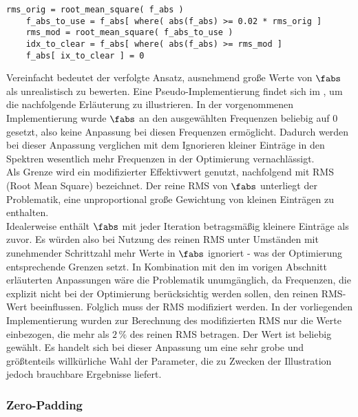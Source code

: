\documentclass[../Report.tex]{subfiles}
\begin{document}
\lstset{language=Python}
\begin{lstlisting}[caption={Pseudocode zur Veranschaulichung der Anpassung des Korrekturterms}, label=code:opt.H.pseudoRMS, numbers=none]
	rms_orig = root_mean_square( f_abs )
	f_abs_to_use = f_abs[ where( abs(f_abs) >= 0.02 * rms_orig ] 
	rms_mod = root_mean_square( f_abs_to_use )
	idx_to_clear = f_abs[ where( abs(f_abs) >= rms_mod ] 
	f_abs[ ix_to_clear ] = 0
\end{lstlisting}
Vereinfacht bedeutet der verfolgte Ansatz, ausnehmend große Werte von $\fabs$ als unrealistisch zu bewerten. Eine Pseudo-Implementierung findet sich im , um die nachfolgende Erläuterung zu illustrieren. In der vorgenommenen Implementierung wurde $\fabs$ an den ausgewählten Frequenzen beliebig auf $0$ gesetzt, also keine Anpassung bei diesen Frequenzen ermöglicht.
Dadurch werden bei dieser Anpassung verglichen mit dem Ignorieren kleiner Einträge in den Spektren wesentlich mehr Frequenzen in der Optimierung vernachlässigt.
\\
Als Grenze wird ein modifizierter Effektivwert genutzt, nachfolgend mit RMS (Root Mean Square) bezeichnet. 
Der reine RMS von $\fabs$ unterliegt der Problematik, eine unproportional große Gewichtung von kleinen Einträgen zu enthalten.
\\
Idealerweise enthält $\fabs$ mit jeder Iteration betragsmäßig kleinere Einträge als zuvor. Es würden also bei Nutzung des reinen RMS unter Umständen mit zunehmender Schrittzahl mehr Werte in $\fabs$ ignoriert - was der Optimierung entsprechende Grenzen setzt. 
In Kombination mit den im vorigen Abschnitt erläuterten Anpassungen wäre die Problematik unumgänglich, da Frequenzen, die explizit nicht bei der Optimierung berücksichtig werden sollen, den reinen RMS-Wert beeinflussen.
Folglich muss der RMS modifiziert werden. In der vorliegenden Implementierung wurden zur Berechnung des modifizierten RMS nur die Werte einbezogen, die mehr als $2 \, \%$ des reinen RMS betragen. Der Wert ist beliebig gewählt. Es handelt sich bei dieser Anpassung um eine sehr grobe und größtenteils willkürliche Wahl der Parameter, die zu Zwecken der Illustration jedoch brauchbare Ergebnisse liefert.

\subsubsection*{Zero-Padding}
\label{subsubsec:opt.H.zeropadd}
\end{document}
